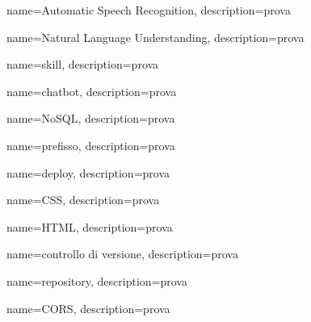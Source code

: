 {
	name=Automatic Speech Recognition,
	description={prova}
}

{
	name=Natural Language Understanding,
	description={prova}
}

{
	name=skill,
	description={prova}
}

{
	name=chatbot,
	description={prova}
}

{
	name=NoSQL,
	description={prova}
}

{
	name=prefisso,
	description={prova}
}

{
	name=deploy,
	description={prova}
}

{
	name=CSS,
	description={prova}
}

{
	name=HTML,
	description={prova}
}

{
	name=controllo di versione,
	description={prova}
}

{
	name=repository,
	description={prova}
}

{
	name=CORS,
	description={prova}
}